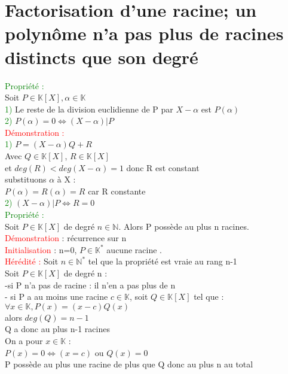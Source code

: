 \documentclass{article}
\begin{document}
\section{Factorisation d'une racine; un polynôme n'a pas plus de racines distincts que son degré}
\textcolor{green}{Propriété :} \\
Soit $P \in \mathbb{K}[X], \alpha \in \mathbb K$ \\
\textcolor{green}{1)} Le reste de la division euclidienne de P par $X-\alpha$ est $P(\alpha)$ \\
\textcolor{green}{2)} $P(\alpha)= 0 \Longleftrightarrow (X- \alpha)|P$ \\
\textcolor{red}{Démonstration :} \\
\textcolor{green}{1)} $P=(X-\alpha)Q + R$ \\
Avec $Q \in \mathbb K [X]$, $R \in \mathbb K [X]$ \\
et $deg(R)< deg(X- \alpha) = 1$ donc R est constant \\
substituons $\alpha$ à X : \\
$P(\alpha)=R(\alpha)=R$ car R constante \\
\textcolor{green}{2)} $(X- \alpha)|P \Longleftrightarrow R=0$ \\
\textcolor{green}{Propriété :} \\
	Soit $P \in \mathbb{K}[X]$ de degré $n \in \mathbb{N}$. Alors P possède au plus n racines. \\
	\textcolor{red}{Démonstration} : récurrence sur n \\
	\textcolor{red}{Initialisation} : n=0, $P \in \mathbb{K}^*$ aucune racine . \\
	\textcolor{red}{Hérédité :} Soit $ n \in \mathbb{N}^*$ tel que la propriété est vraie au rang n-1 \\
	Soit $ P \in \mathbb{K}[X]$ de degré n : \\
	-si P n'a pas de racine : il n'en a pas plus de n\\
	- si P a au moins une racine $c \in \mathbb{K}$,
		soit $Q \in \mathbb{K}[X]$ tel que : \\
		$\forall x \in \mathbb{K}, P(x)=(x-c)Q(x)$ \\
		alors $deg(Q)=n-1$ \\
			Q a donc au plus n-1 racines \\
			On a pour $x \in \mathbb{K}$ : \\
				$P(x)=0 \Leftrightarrow (x=c)$ ou $Q(x)=0$ \\
			P possède au plus une racine de plus que Q donc au plus n au total
\end{document}

